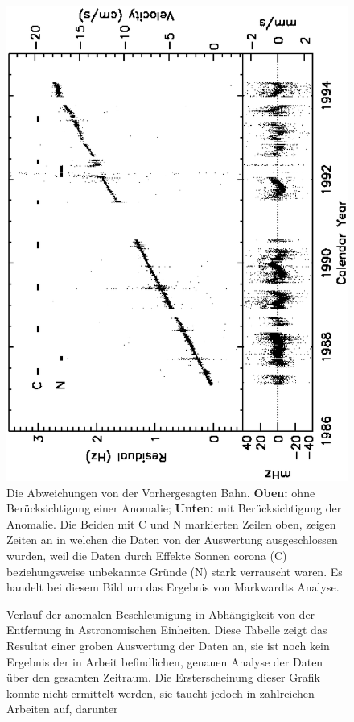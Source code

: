  
\begin{figure}[htbn]
\begin{center}
\noindent    
\includegraphics[angle=-90,width=0.8\linewidth]{images/M02P10beide}
\end{center}
\vskip -10pt
  \caption{Die Abweichungen von der Vorhergesagten Bahn. {\bf Oben:} ohne Berücksichtigung einer Anomalie; {\bf Unten:} mit Berücksichtigung der Anomalie. Die Beiden mit C und N markierten Zeilen oben, zeigen Zeiten an in welchen die Daten von der Auswertung ausgeschlossen wurden, weil die Daten durch Effekte Sonnen corona (C) beziehungsweise unbekannte Gründe (N) stark verrauscht waren. Es handelt bei diesem Bild um das Ergebnis von Markwardts Analyse\cite{Markwardt2002}.}\label{fig:Markwardvergl}
\end{figure} 
 
\begin{figure}[htnb]
\begin{center}
\noindent    
{}
\end{center}
\vskip -10pt
  \caption{
Verlauf der anomalen Beschleunigung in Abhängigkeit von der Entfernung in Astronomischen Einheiten. Diese Tabelle zeigt das Resultat einer groben Auswertung der Daten an, sie ist noch kein Ergebnis der in Arbeit befindlichen, genauen Analyse der Daten über den gesamten Zeitraum. Die Ersterscheinung dieser Grafik konnte nicht ermittelt werden, sie taucht jedoch in zahlreichen Arbeiten auf, darunter\cite{Anderson2002}\cite{Nieto2005}\cite{Turyshev2010}
}
\label{fig:anomalie}
\end{figure} 
 

